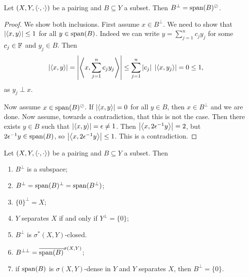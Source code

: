 \begin{proposition} \label{perpAsPolar}
Let $\sSet{X,Y,\pair{\cdot,\cdot}}$ be a pairing and $B\subseteq Y$ a subset. Then $B^\perp = \operatorname{span}(B)^\oslash$.
\end{proposition}
\begin{proof}
We show both inclusions. First assume $x\in B^\perp$. We need to show that $\left|\left\langle x,y \right\rangle\right| \leq 1$ for all $y\in \operatorname{span}(B)$. Indeed we can write $y = \sum_{j=1}^n c_jy_j$ for some $c_j\in\mathbb{F}$ and $y_j\in B$. Then
\[ \left|\left\langle x,y \right\rangle\right| = \left|\left\langle x, \sum_{j=1}^n c_jy_j \right\rangle\right| \leq \sum_{j=1}^n |c_j|\;\left|\left\langle x, y_j \right\rangle\right| = 0 \leq 1, \]
as $y_j\perp x$.

Now assume $x\in \operatorname{span}(B)^\oslash$. If $\left|\left\langle x,y \right\rangle\right| = 0$ for all $y\in B$, then $x\in B^\perp$ and we are done. Now assume, towards a contradiction, that this is not the case. Then there exists $y\in B$ such that $\left|\left\langle x,y \right\rangle\right| = \epsilon \neq 1$. Then $\left|\left\langle x,2\epsilon^{-1}y \right\rangle\right| = 2$, but $2\epsilon^{-1}y\in\operatorname{span}(B)$, so $\left|\left\langle x,2\epsilon^{-1}y \right\rangle\right| \leq 1$. This is a contradiction.
\end{proof}
\begin{corollary} \label{corollaryPerpAsPolar}
Let $\sSet{X,Y,\pair{\cdot,\cdot}}$ be a pairing and $B\subseteq Y$ a subset. Then
\begin{enumerate}
\item $B^\perp$ is a subspace;
\item $B^\perp = \operatorname{span}(B)^\perp = \operatorname{span}(B^\perp)$;
\item $\{0\}^\perp = X$;
\item $Y$ separates $X$ \textup{if and only if} $Y^\perp = \{0\}$;
\item $B^\perp$ is $\sigma^*(X,Y)$-closed.
\item $B^{\perp\perp} = \overline{\operatorname{span}(B)}^{\sigma(X,Y)}$;
\item if $\operatorname{span}(B)$ is $\sigma(X,Y)$-dense in $Y$ and $Y$ separates $X$, then $B^\perp = \{0\}$.
\end{enumerate}
\end{corollary}
